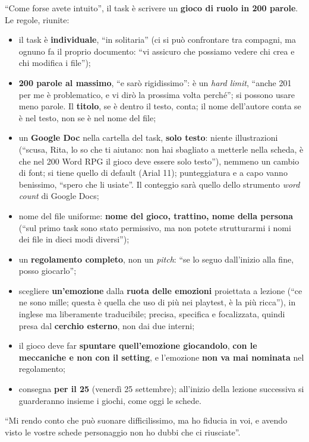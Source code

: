 ``Come forse avete intuito'', il task è scrivere un \textbf{gioco di ruolo in 200
parole}. Le regole, riunite:
\begin{itemize}
  \item il task è \textbf{individuale}, ``in solitaria'' (ci si può confrontare tra
        compagni, ma ognuno fa il proprio documento: ``vi assicuro che possiamo
        vedere chi crea e chi modifica i file'');
  \item \textbf{200 parole al massimo}, ``e sarò rigidissimo'': è un \emph{hard
        limit}, ``anche 201 per me è problematico, e vi dirò la prossima volta
        perché''; si possono usare meno parole. Il \textbf{titolo}, se è dentro il
        testo, conta; il nome dell'autore conta se è nel testo, non se è nel nome
        del file;
  \item un \textbf{Google Doc} nella cartella del task, \textbf{solo testo}: niente
        illustrazioni (``scusa, Rita, lo so che ti aiutano: non hai sbagliato a
        metterle nella scheda, è che nel 200 Word RPG il gioco deve essere solo
        testo''), nemmeno un cambio di font; si tiene quello di default (Arial 11);
        punteggiatura e a capo vanno benissimo, ``spero che li usiate''. Il conteggio
        sarà quello dello strumento \emph{word count} di Google Docs;
  \item nome del file uniforme: \textbf{nome del gioco, trattino, nome della
        persona} (``sul primo task sono stato permissivo, ma non potete strutturarmi
        i nomi dei file in dieci modi diversi'');
  \item un \textbf{regolamento completo}, non un \emph{pitch}: ``se lo seguo
        dall'inizio alla fine, posso giocarlo'';
  \item scegliere \textbf{un'emozione} dalla \textbf{ruota delle emozioni} proiettata
        a lezione (``ce ne sono mille; questa è quella che uso di più nei playtest, è
        la più ricca''), in inglese ma liberamente traducibile; precisa, specifica e
        focalizzata, quindi presa dal \textbf{cerchio esterno}, non dai due interni;
  \item il gioco deve far \textbf{spuntare quell'emozione giocandolo}, \textbf{con
        le meccaniche e non con il setting}, e l'emozione \textbf{non va mai
        nominata} nel regolamento;
  \item consegna \textbf{per il 25} (venerdì 25 settembre); all'inizio della lezione
        successiva si guarderanno insieme i giochi, come oggi le schede.
\end{itemize}
``Mi rendo conto che può suonare difficilissimo, ma ho fiducia in voi, e avendo visto
le vostre schede personaggio non ho dubbi che ci riusciate''.


